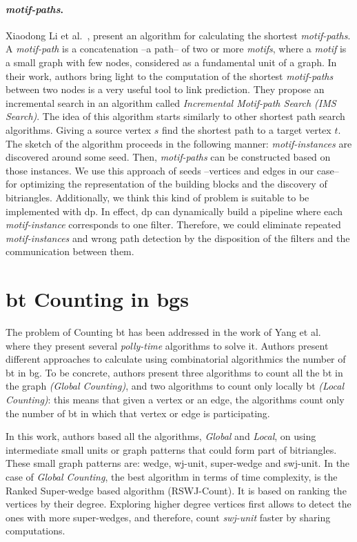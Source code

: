 \paragraph{\emph{motif-paths}.} Xiaodong Li et al.~\cite{Li2019MotifPA}, present an algorithm for calculating the shortest \emph{motif-paths}.
A \emph{motif-path} is a concatenation --a path--  of two or more \emph{motifs}, where a \emph{motif} is a small graph with few nodes, considered as a fundamental unit of a graph.
In their work, authors bring light to the computation of the shortest \emph{motif-paths} between two nodes is a very useful tool to link prediction. They propose an incremental search in an algorithm called \emph{Incremental Motif-path Search (IMS Search)}.
The idea of this algorithm starts similarly to other shortest path search algorithms. Giving a source vertex $s$ find the shortest path to a target vertex $t$.
The sketch of the algorithm proceeds in the following manner: \emph{motif-instances} are discovered around some seed. Then, \emph{motif-paths} can be constructed based on those instances. 
We use this approach of seeds --vertices and edges in our case-- for optimizing the representation of the building blocks and the discovery of bitriangles. 
Additionally, we think this kind of problem is suitable to be implemented with \acrlong{dp}. 
In effect, \acrshort{dp} can dynamically build a pipeline where each \emph{motif-instance} corresponds to one filter. 
Therefore, we could eliminate repeated \emph{motif-instances} and wrong path detection by the disposition of the filters and the communication between them.

\section{\acrlong{bt} Counting in \acrlong{bg}s}\label{sec:rel-work:counting}
The problem of Counting \acrshort{bt} has been addressed in the work of Yang et al.~\cite{btcount} where they present several \emph{polly-time} algorithms to solve it.
Authors present different approaches to calculate using  combinatorial algorithmics the number of \acrshort{bt} in \acrshort{bg}. 
To be concrete, authors present three algorithms to count all the \acrshort{bt} in the graph \emph{(Global Counting)}, and two algorithms to count only locally \acrshort{bt} \emph{(Local Counting)}: this means that given a vertex or an edge, the algorithms count only the number of \acrshort{bt} in which 
that vertex or edge is participating.

In this work, authors based all the algorithms, \emph{Global} and \emph{Local}, on using intermediate small units or graph patterns that could form part of  bitriangles. These small graph patterns are: wedge, wj-unit, super-wedge and swj-unit.
In the case of \emph{Global Counting}, the best algorithm in terms of time complexity, is the Ranked Super-wedge based algorithm (RSWJ-Count). 
It is based on ranking the vertices by their degree. Exploring higher degree vertices first allows to detect the ones with more super-wedges, and therefore, count \emph{swj-unit} faster by sharing computations. 

